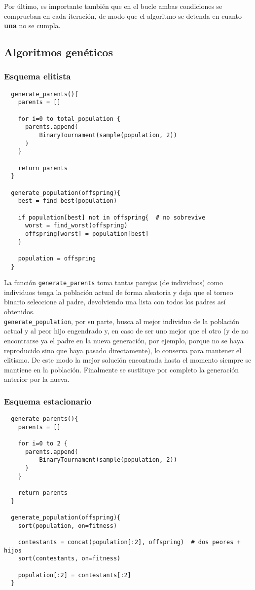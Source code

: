 \documentclass[11pt]{article}
\theoremstyle{plain}
\theoremstyle{definition}
\begin{document}
Por último, es importante también que en el bucle ambas condiciones se comprueban en cada iteración, de modo que el algoritmo se detenda en cuanto \textbf{una} no se cumpla. \\

\subsection{Algoritmos genéticos}
\subsubsection{Esquema elitista}

\begin{lstlisting}
  generate_parents(){
    parents = []

    for i=0 to total_population {
      parents.append(
          BinaryTournament(sample(population, 2))
      )
    }

    return parents
  }

  generate_population(offspring){
    best = find_best(population)

    if population[best] not in offspring{  # no sobrevive
      worst = find_worst(offspring)
      offspring[worst] = population[best]
    }

    population = offspring
  }
\end{lstlisting}

La función \texttt{generate\_parents} toma tantas parejas (de individuos) como individuos tenga la población actual de forma aleatoria y deja que el torneo binario seleccione al padre, devolviendo una lista con todos los padres así obtenidos. \\

\texttt{generate\_population}, por su parte, busca al mejor individuo de la población actual y al peor hijo engendrado y, en caso de ser uno mejor que el otro (y de no encontrarse ya el padre en la nueva generación, por ejemplo, porque no se haya reproducido sino que haya pasado directamente), lo conserva para mantener el elitismo. De este modo la mejor solución encontrada hasta el momento siempre se mantiene en la población. Finalmente se sustituye por completo la generación anterior por la nueva. \\

\subsubsection{Esquema estacionario}
\begin{lstlisting}
  generate_parents(){
    parents = []

    for i=0 to 2 {
      parents.append(
          BinaryTournament(sample(population, 2))
      )
    }

    return parents
  }

  generate_population(offspring){
    sort(population, on=fitness)

    contestants = concat(population[:2], offspring)  # dos peores + hijos
    sort(contestants, on=fitness)

    population[:2] = contestants[:2]
  }
\end{lstlisting}
\end{document}
